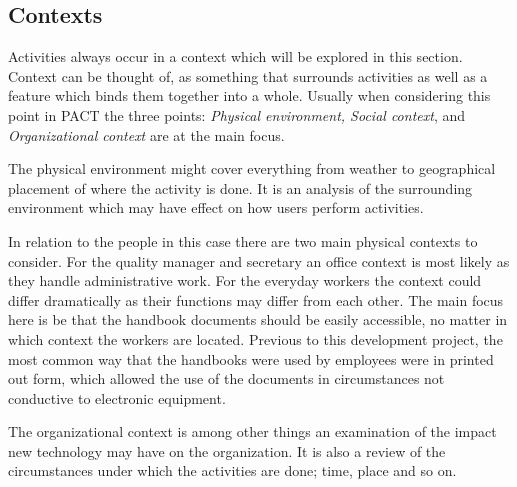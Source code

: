 \subsection{Contexts}
Activities always occur in a context which will be explored in this section.
Context can be thought of, as something that surrounds activities as well as a feature which binds them together into a whole.
Usually when considering this point in PACT the three points: \textit{Physical environment, Social context}, and \textit{Organizational context} are at the main focus.

The physical environment might cover everything from weather to geographical placement of where the activity is done.
It is an analysis of the surrounding environment which may have effect on how users perform activities.

In relation to the people in this case there are two main physical contexts to consider.
For the quality manager and secretary an office context is most likely as they handle administrative work.
For the everyday workers the context could differ dramatically as their functions may differ from each other.
The main focus here is be that the handbook documents should be easily accessible, no matter in which context the workers are located.
Previous to this development project,
the most common way that the handbooks were used by employees were in printed out form, which allowed the use of the documents in circumstances not conductive to electronic equipment. %



The organizational context is among other things an examination of the impact new technology may have on the organization.
It is also a review of the circumstances under which the activities are done; time, place and so on.


